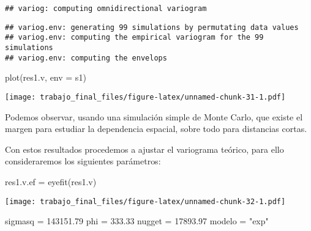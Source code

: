 \documentclass[
  12pt,
]{article}
\newenvironment{Shaded}{\begin{snugshade}}{\end{snugshade}}
\newcommand{\AttributeTok}[1]{\textcolor[rgb]{0.77,0.63,0.00}{#1}}
\newcommand{\DecValTok}[1]{\textcolor[rgb]{0.00,0.00,0.81}{#1}}
\newcommand{\FloatTok}[1]{\textcolor[rgb]{0.00,0.00,0.81}{#1}}
\newcommand{\FunctionTok}[1]{\textcolor[rgb]{0.00,0.00,0.00}{#1}}
\newcommand{\NormalTok}[1]{#1}
\newcommand{\OtherTok}[1]{\textcolor[rgb]{0.56,0.35,0.01}{#1}}
\newcommand{\SpecialCharTok}[1]{\textcolor[rgb]{0.00,0.00,0.00}{#1}}
\newcommand{\StringTok}[1]{\textcolor[rgb]{0.31,0.60,0.02}{#1}}
\begin{document}
\begin{verbatim}
## variog: computing omnidirectional variogram
\end{verbatim}

\begin{Shaded}
\end{Shaded}

\begin{verbatim}
## variog.env: generating 99 simulations by permutating data values
## variog.env: computing the empirical variogram for the 99 simulations
## variog.env: computing the envelops
\end{verbatim}

\begin{Shaded}
\begin{Highlighting}[]
\FunctionTok{plot}\NormalTok{(res1.v, }\AttributeTok{env =}\NormalTok{ s1)}
\end{Highlighting}
\end{Shaded}

\texttt{[image: trabajo\_final\_files/figure-latex/unnamed-chunk-31-1.pdf]}

Podemos observar, usando una simulación simple de Monte Carlo, que
existe el margen para estudiar la dependencia espacial, sobre todo para
distancias cortas.

Con estos resultados procedemos a ajustar el variograma teórico, para
ello consideraremos los siguientes parámetros:

\begin{Shaded}
\begin{Highlighting}[]
\NormalTok{res1.v.ef }\OtherTok{=} \FunctionTok{eyefit}\NormalTok{(res1.v)}
\end{Highlighting}
\end{Shaded}

\texttt{[image: trabajo\_final\_files/figure-latex/unnamed-chunk-32-1.pdf]}

\begin{Shaded}
\begin{Highlighting}[]
\NormalTok{sigmasq }\OtherTok{=} \FloatTok{143151.79}
\NormalTok{phi }\OtherTok{=} \FloatTok{333.33}
\NormalTok{nugget }\OtherTok{=} \FloatTok{17893.97}
\NormalTok{modelo }\OtherTok{=} \StringTok{"exp"}
\end{Highlighting}
\end{Shaded}
\end{document}
